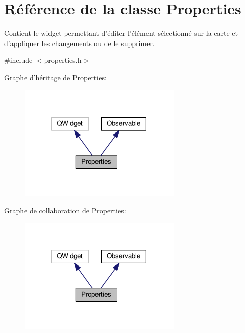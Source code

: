 \hypertarget{classProperties}{\section{Référence de la classe Properties}
\label{classProperties}
}


Contient le widget permettant d’éditer l’élément sélectionné sur la carte et d’appliquer les changements ou de le supprimer.  




{\ttfamily \#include $<$properties.\+h$>$}



Graphe d'héritage de Properties\+:\nopagebreak
\begin{figure}[H]
\begin{center}
\leavevmode
\includegraphics[width=219pt]{de/d7f/classProperties__inherit__graph}
\end{center}
\end{figure}


Graphe de collaboration de Properties\+:\nopagebreak
\begin{figure}[H]
\begin{center}
\leavevmode
\includegraphics[width=219pt]{dc/d0a/classProperties__coll__graph}
\end{center}
\end{figure}
